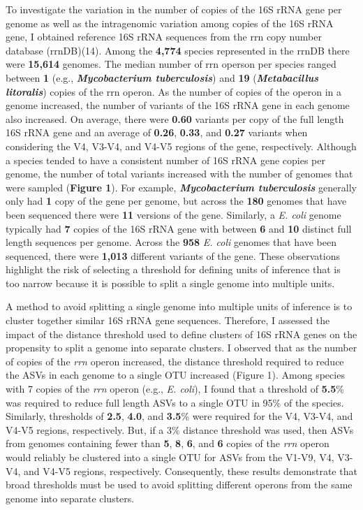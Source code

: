\documentclass[
]{article}
\begin{document}
To investigate the variation in the number of copies of the 16S rRNA
gene per genome as well as the intragenomic variation among copies of
the 16S rRNA gene, I obtained reference 16S rRNA sequences from the rrn
copy number database (rrnDB)(14). Among the \textbf{4,774} species
represented in the rrnDB there were \textbf{15,614} genomes. The median
number of rrn operson per species ranged between \textbf{1} (e.g.,
\textbf{\emph{Mycobacterium tuberculosis}}) and \textbf{19}
(\textbf{\emph{Metabacillus litoralis}}) copies of the rrn operon. As
the number of copies of the operon in a genome increased, the number of
variants of the 16S rRNA gene in each genome also increased. On average,
there were \textbf{0.60} variants per copy of the full length 16S rRNA
gene and an average of \textbf{0.26}, \textbf{0.33}, and \textbf{0.27}
variants when considering the V4, V3-V4, and V4-V5 regions of the gene,
respectively. Although a species tended to have a consistent number of
16S rRNA gene copies per genome, the number of total variants increased
with the number of genomes that were sampled (\textbf{Figure 1}). For
example, \textbf{\emph{Mycobacterium tuberculosis}} generally only had
\textbf{1} copy of the gene per genome, but across the \textbf{180}
genomes that have been sequenced there were \textbf{11} versions of the
gene. Similarly, a \emph{E. coli} genome typically had \textbf{7} copies
of the 16S rRNA gene with between \textbf{6} and \textbf{10} distinct
full length sequences per genome. Across the \textbf{958} \emph{E. coli}
genomes that have been sequenced, there were \textbf{1,013} different
variants of the gene. These observations highlight the risk of selecting
a threshold for defining units of inference that is too narrow because
it is possible to split a single genome into multiple units.

A method to avoid splitting a single genome into multiple units of
inference is to cluster together similar 16S rRNA gene sequences.
Therefore, I assessed the impact of the distance threshold used to
define clusters of 16S rRNA genes on the propensity to split a genome
into separate clusters. I observed that as the number of copies of the
\emph{rrn} operon increased, the distance threshold required to reduce
the ASVs in each genome to a single OTU increased (Figure 1). Among
species with 7 copies of the \emph{rrn} operon (e.g., \emph{E. coli}), I
found that a threshold of \textbf{5.5}\% was required to reduce full
length ASVs to a single OTU in 95\% of the species. Similarly,
thresholds of \textbf{2.5}, \textbf{4.0}, and \textbf{3.5}\% were
required for the V4, V3-V4, and V4-V5 regions, respectively. But, if a
3\% distance threshold was used, then ASVs from genomes containing fewer
than \textbf{5}, \textbf{8}, \textbf{6}, and \textbf{6} copies of the
\emph{rrn} operon would reliably be clustered into a single OTU for ASVs
from the V1-V9, V4, V3-V4, and V4-V5 regions, respectively.
Consequently, these results demonstrate that broad thresholds must be
used to avoid splitting different operons from the same genome into
separate clusters.
\end{document}

